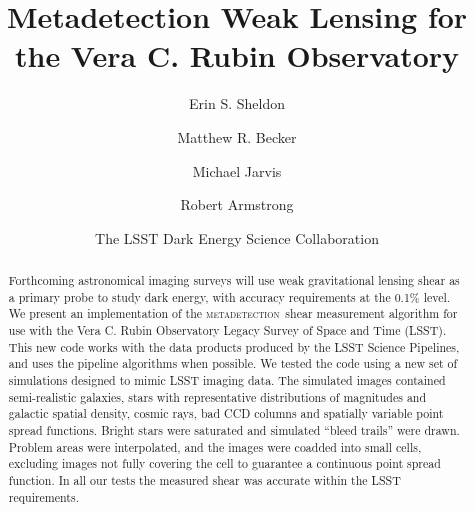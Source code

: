 \documentclass[twocolumn,twocolappendix,astrosym]{openjournal}
\newcommand{\dm}{LSST Science Pipelines}
\newcommand{\mdet}{\textsc{metadetection}}
\newcommand{\Mcal}{\textsc{Metacalibration}}
\newcommand{\Mdet}{\textsc{Metadetection}}
\begin{document}



\title{Metadetection Weak Lensing for the Vera C. Rubin Observatory}

\author{Erin S. Sheldon}
\author{Matthew R. Becker}
\author{Michael Jarvis}
\author{Robert Armstrong}
\author{The LSST Dark Energy Science Collaboration}


\begin{abstract}

        Forthcoming astronomical imaging surveys will use weak gravitational
        lensing shear as a primary probe to study dark energy, with accuracy
        requirements at the 0.1\% level.  We present an implementation of the
        \mdet\ shear measurement algorithm for use with the Vera C. Rubin
        Observatory Legacy Survey of Space and Time (LSST).  This new code
        works with the data products produced by the \dm, and uses the pipeline
        algorithms when possible.  We tested the code using a new set of
        simulations designed to mimic LSST imaging data.  The simulated images
        contained semi-realistic galaxies, stars with representative
        distributions of magnitudes and galactic spatial density, cosmic rays,
        bad CCD columns and spatially variable point spread functions.  Bright
        stars were saturated and simulated ``bleed trails'' were drawn.
        Problem areas were interpolated, and the images were coadded into small
        cells, excluding images not fully covering the cell to guarantee a
        continuous point spread function.  In all our tests the measured shear
        was accurate within the LSST requirements.



\end{abstract}
\end{document}

